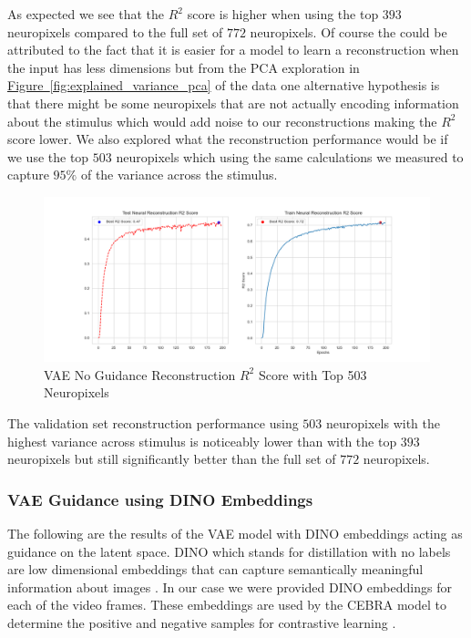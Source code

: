 \documentclass[12pt, letterpaper]{article}
\begin{document}
As expected we see that the $R^2$ score is higher when using the top $393$ neuropixels compared to the full set of $772$ neuropixels. Of course the could be attributed to the fact that it is easier for a model to learn a reconstruction when the input has less dimensions but from the PCA exploration in \hyperref[fig:explained_variance_pca]{Figure~\ref{fig:explained_variance_pca}} of the data one alternative hypothesis is that there might be some neuropixels that are not actually encoding information about the stimulus which would add noise to our reconstructions making the $R^2$ score lower. We also explored what the reconstruction performance would be if we use the top $503$ neuropixels which using the same calculations we measured to capture $95\%$ of the variance across the stimulus.

\begin{figure}[H]
    \centering
    \includegraphics[width=1.0\textwidth]{x_r2_128dim_503_top_var_200_epochs_0.05_beta_2_layer.png}
    \caption{VAE No Guidance Reconstruction $R^2$ Score with Top 503 Neuropixels}
    \label{fig:vae_no_guidance_top503}
\end{figure}

The validation set reconstruction performance using $503$ neuropixels with the highest variance across stimulus is noticeably lower than with the top $393$ neuropixels but still significantly better than the full set of $772$ neuropixels. 

\subsubsection{VAE Guidance using DINO Embeddings}
\label{subsubsec:vae_guidance_DINO}
The following are the results of the VAE model with DINO embeddings acting as guidance on the latent space. DINO which stands for distillation with no labels are low dimensional embeddings that can capture semantically meaningful information about images \cite{dino}. In our case we were provided DINO \cite{dino} embeddings for each of the video frames. These embeddings are used by the CEBRA model to determine the positive and negative samples for contrastive learning \cite{schneider2023}.
\end{document}
